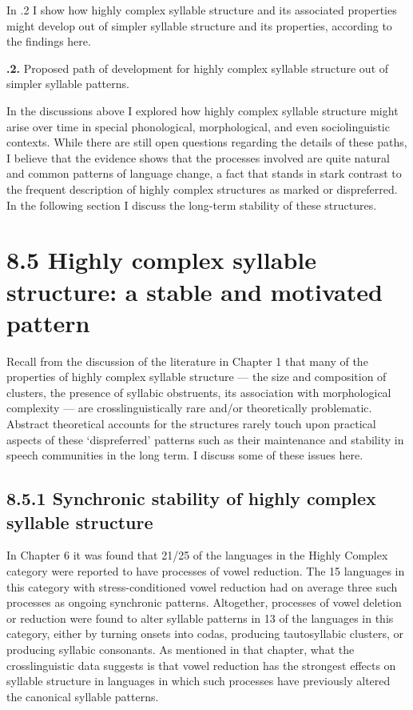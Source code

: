   In .2 I show how highly complex syllable structure and its associated properties might develop out of simpler syllable structure and its properties, according to the findings here.







\textbf{.2.} Proposed path of development for highly complex syllable structure out of simpler syllable patterns.



  In the discussions above I explored how highly complex syllable structure might arise over time in special phonological, morphological, and even sociolinguistic contexts. While there are still open questions regarding the details of these paths, I believe that the evidence shows that the processes involved are quite natural and common patterns of language change, a fact that stands in stark contrast to the frequent description of highly complex structures as marked or dispreferred. In the following section I discuss the long-term stability of these structures.


\section{8.5 Highly complex syllable structure: a stable and motivated pattern}

  Recall from the discussion of the literature in Chapter 1 that many of the properties of highly complex syllable structure — the size and composition of clusters, the presence of syllabic obstruents, its association with morphological complexity — are crosslinguistically rare and/or theoretically problematic. Abstract theoretical accounts for the structures rarely touch upon practical aspects of these ‘dispreferred’ patterns such as their maintenance and stability in speech communities in the long term. I discuss some of these issues here.


\subsection{8.5.1 Synchronic stability of highly complex syllable structure}

  In Chapter 6 it was found that 21/25 of the languages in the Highly Complex category were reported to have processes of vowel reduction. The 15 languages in this category with stress-conditioned vowel reduction had on average three such processes as ongoing synchronic patterns. Altogether, processes of vowel deletion or reduction were found to alter syllable patterns in 13 of the languages in this category, either by turning onsets into codas, producing tautosyllabic clusters, or producing syllabic consonants. As mentioned in that chapter, what the crosslinguistic data suggests is that vowel reduction has the strongest effects on syllable structure in languages in which such processes have previously altered the canonical syllable patterns.



